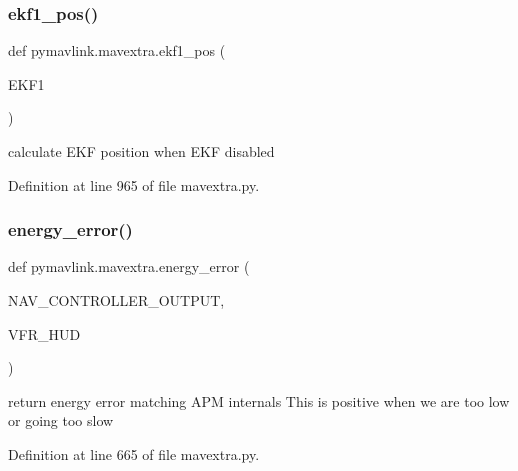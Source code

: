 \mbox{\label{namespacepymavlink_1_1mavextra_a0982fb72ae1fd1006e089debf6b98440}} 
\subsubsection{\texorpdfstring{ekf1\_pos()}{ekf1\_pos()}}
{\footnotesize\ttfamily def pymavlink.\+mavextra.\+ekf1\+\_\+pos (\begin{DoxyParamCaption}\item[{}]{E\+K\+F1 }\end{DoxyParamCaption})}

\begin{DoxyVerb}calculate EKF position when EKF disabled\end{DoxyVerb}
 

Definition at line 965 of file mavextra.\+py.

\mbox{\label{namespacepymavlink_1_1mavextra_a5b8fa5473a3b0961f0a53ab1edd02dc1}} 
\subsubsection{\texorpdfstring{energy\_error()}{energy\_error()}}
{\footnotesize\ttfamily def pymavlink.\+mavextra.\+energy\+\_\+error (\begin{DoxyParamCaption}\item[{}]{N\+A\+V\+\_\+\+C\+O\+N\+T\+R\+O\+L\+L\+E\+R\+\_\+\+O\+U\+T\+P\+UT,  }\item[{}]{V\+F\+R\+\_\+\+H\+UD }\end{DoxyParamCaption})}

\begin{DoxyVerb}return energy error matching APM internals
This is positive when we are too low or going too slow
\end{DoxyVerb}
 

Definition at line 665 of file mavextra.\+py.

\mbox{\label{namespacepymavlink_1_1mavextra_ae817df92c23b96ec6e16093c368e729b}} 
